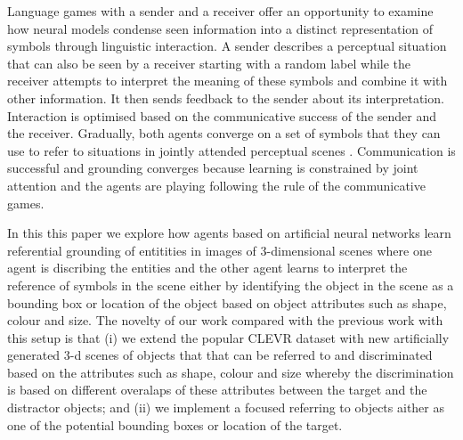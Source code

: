 \documentclass[11pt]{article}
\begin{document}
Language games with a sender and a receiver \citep{Clark:1996aa,Bartlett:2005aa,Kirby:2008ab,SteelsLoetzsch:2009,Zaslavsky:2018aa} offer an opportunity to examine how neural models condense seen information into a distinct representation of symbols through linguistic interaction.
A sender describes a perceptual situation that can also be seen by a receiver starting with a random label while
the receiver attempts to interpret the meaning of these symbols and combine it with other information.
It then sends feedback to the sender about its interpretation.
Interaction is optimised based on the communicative success of the sender and the receiver.
Gradually, both agents converge on a set of symbols that they can use to refer to situations in jointly attended perceptual scenes \citep{Chai:2016aa,Kelleher:2020aa}.
Communication is successful and grounding converges because learning is constrained by joint attention and the agents are playing following the rule of the communicative games.

In this this paper we explore how agents based on artificial neural networks learn referential grounding of entitities in images of 3-dimensional scenes where one agent is discribing the entities and the other agent learns to interpret the reference of symbols in the scene either by identifying the object in the scene as a bounding box or location of the object based on object attributes such as shape, colour and size.
The novelty of our work compared with the previous work with this setup \citep{Kharitonov2019} is that (i) we extend the popular CLEVR dataset \citep{Johnson2016} with new artificially generated 3-d scenes of objects that that can be referred to and discriminated based on the attributes such as shape, colour and size whereby the discrimination is based on different overalaps of these attributes between the target and the distractor objects; and (ii) we implement a focused referring to objects aither as one of the potential bounding boxes or location of the target.


\end{document}
